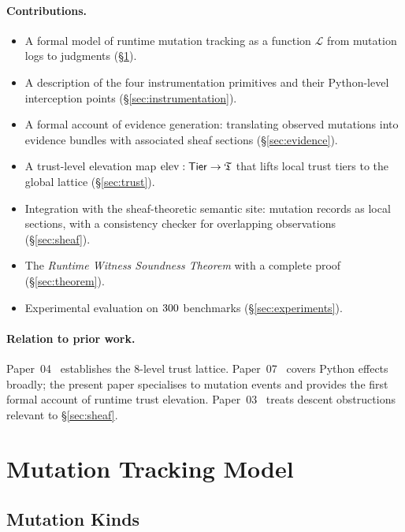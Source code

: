\documentclass[11pt]{article}
\newcommand{\LiveTrack}{\mathcal{L}}             %
\newcommand{\elevate}{\mathrm{elev}}             %
\newcommand{\TierLocal}{\mathsf{Tier}}           %
\begin{document}
\paragraph{Contributions.}
\begin{itemize}
\item A formal model of runtime mutation tracking as a function
      $\LiveTrack$ from mutation logs to \JuGeo{} judgments
      (\S\ref{sec:model}).
\item A description of the four instrumentation primitives and their
      Python-level interception points (\S\ref{sec:instrumentation}).
\item A formal account of evidence generation: translating observed
      mutations into evidence bundles with associated sheaf sections
      (\S\ref{sec:evidence}).
\item A trust-level elevation map $\elevate : \TierLocal \to \Talg$
      that lifts local trust tiers to the global lattice
      (\S\ref{sec:trust}).
\item Integration with the sheaf-theoretic semantic site: mutation
      records as local sections, with a consistency checker for
      overlapping observations (\S\ref{sec:sheaf}).
\item The \emph{Runtime Witness Soundness Theorem} with a complete
      \LEAN{} proof (\S\ref{sec:theorem}).
\item Experimental evaluation on $300$ benchmarks
      (\S\ref{sec:experiments}).
\end{itemize}

\paragraph{Relation to prior work.}
Paper~04~\cite{paper04-trust} establishes the 8-level trust lattice.
Paper~07~\cite{paper07-python} covers Python effects broadly; the
present paper specialises to mutation events and provides the first
formal account of runtime trust elevation.  Paper~03~\cite{paper03-descent}
treats descent obstructions relevant to \S\ref{sec:sheaf}.

\section{Mutation Tracking Model}
\label{sec:model}

\subsection{Mutation Kinds}
\label{subsec:kinds}
\end{document}
